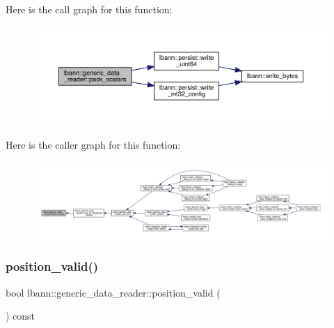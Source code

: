 Here is the call graph for this function\+:\nopagebreak
\begin{figure}[H]
\begin{center}
\leavevmode
\includegraphics[width=350pt]{classlbann_1_1generic__data__reader_a93dddd2276ddc34cc97922ee27c44582_cgraph}
\end{center}
\end{figure}
Here is the caller graph for this function\+:\nopagebreak
\begin{figure}[H]
\begin{center}
\leavevmode
\includegraphics[width=350pt]{classlbann_1_1generic__data__reader_a93dddd2276ddc34cc97922ee27c44582_icgraph}
\end{center}
\end{figure}
\mbox{\label{classlbann_1_1generic__data__reader_a2b10538440d784f0f12582a5407acef2}} 
\subsubsection{\texorpdfstring{position\+\_\+valid()}{position\_valid()}}
{\footnotesize\ttfamily bool lbann\+::generic\+\_\+data\+\_\+reader\+::position\+\_\+valid (\begin{DoxyParamCaption}{ }\end{DoxyParamCaption}) const\hspace{0.3cm}{\ttfamily [inline]}}




